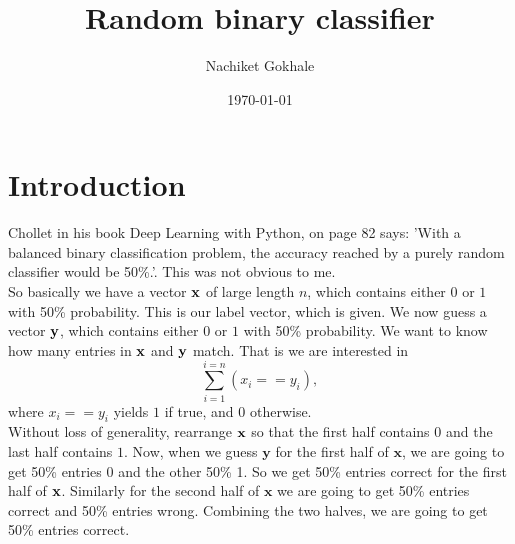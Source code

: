 \documentclass{article}
\newcommand{\beq}{\begin{equation}}
\newcommand{\eeq}{\end{equation}}
\begin{document}
\title{Random binary classifier}
\author{Nachiket Gokhale}
\date{\today}
\maketitle
\section{Introduction}
Chollet in his book Deep Learning with Python, on page 82 says: 'With a balanced binary classification
problem, the accuracy reached by a purely random classifier would be 50\%.'. This was not obvious to me.\\

So basically we have a vector ${\bf{x}}$ of large length $n$, which contains either $0$ or $1$ with 50\% probability. This is our label vector, which is given. We now guess a vector ${\bf{y}}$, which contains either $0$ or $1$ with 50\% probability. We want to know how many entries in ${\bf{x}}$ and ${\bf{y}}$ match. That is we are interested in
\beq
\sum_{i=1}^{i=n} (x_{i} == y_{i}), 
\eeq
where $x_{i} == y_{i}$ yields $1$ if true, and $0$ otherwise.\\

Without loss of generality, rearrange ${\bf{x}}$ so that the first half contains $0$ and the last half contains $1$.  Now, when we guess $\mathbf{y}$ for the first half of ${\mathbf{x}}$, we are going to get 50\% entries 0 and the other 50\% 1. So we get 50\% entries correct for the first half of ${\bf{x}}$. Similarly for the second half of ${\mathbf{x}}$ we are going to get 50\% entries correct and 50\% entries wrong. Combining the two halves, we are going to get 50\% entries correct.
\end{document}
